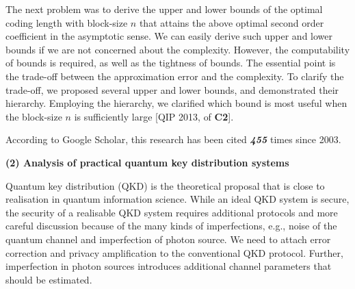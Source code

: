 The next problem was to derive the upper and lower bounds of the optimal coding length with block-size $n$ 
that attains the above optimal second order coefficient in the asymptotic sense. 
We can easily derive such upper and lower bounds if we are not concerned about the complexity.
However, the computability of bounds is required, as well as the tightness of bounds.
The essential point is the trade-off between the approximation error and the complexity. 
To clarify the trade-off, 
we proposed several upper and lower bounds, and demonstrated their hierarchy. 
Employing the hierarchy, we clarified which bound is most 
useful when the block-size $n$ is sufficiently large [QIP 2013, \cite{THc13-1} of \textbf{C2}].


According to Google Scholar, this research has been cited \textbf{\textit{455}} %
 times since 2003.

\textbf{(2) Analysis of practical quantum key distribution systems}

Quantum key distribution (QKD) is the theoretical proposal that is close to realisation in quantum information science. 
While an ideal QKD system is secure, 
the security of a realisable QKD system requires additional protocols and more careful discussion 
because of the many kinds of imperfections, e.g., noise of the quantum channel and imperfection of photon source. 
We need to attach error correction and privacy amplification to the conventional QKD protocol. Further, imperfection in photon sources introduces additional channel parameters that should be estimated.

